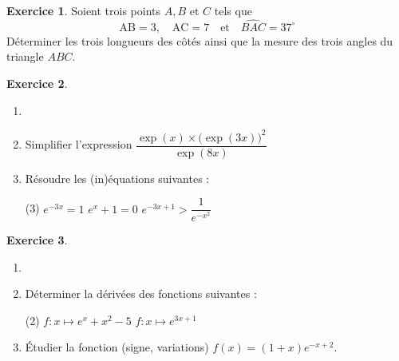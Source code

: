 \documentclass{article}
\theoremstyle{definition}
\newtheorem{exercice}{Exercice}
\begin{document}
\begin{exercice}
  Soient trois points $A, B$ et $C$ tels que
  $$
  \mathrm{AB} = 3, \quad \mathrm{AC} = 7 \quad \text{et} \quad \widehat{BAC} = 37^\circ
  $$
  Déterminer les trois longueurs des côtés ainsi que la mesure des trois angles du triangle $ABC$.
\end{exercice}

\vfill

\begin{exercice}
  \begin{enumerate}
    \item[]
    \item Simplifier l'expression $\dfrac{\exp(x)\times\bigl(\exp(3x)\bigr)^2}{\exp(8x)}$
    \item Résoudre les (in)équations suivantes :
      \begin{tasks}(3)
        \task $e^{-3x} = 1$
        \task $e^x + 1 = 0$
        \task $e^{-3x+1}>\dfrac1{e^{-x^2}}$
      \end{tasks}
  \end{enumerate}
\end{exercice}

\vfill

\begin{exercice}
  \begin{enumerate}
    \item[]
    \item Déterminer la dérivées des fonctions suivantes :
      \begin{tasks}(2)
        \task $f : x \mapsto e^{x} + x^2 - 5$
        \task $f : x \mapsto e^{3x+1}$
      \end{tasks}
    \item Étudier la fonction (signe, variations) $f(x)=(1+x)e^{-x+2}$.
  \end{enumerate}
\end{exercice}
\end{document}
